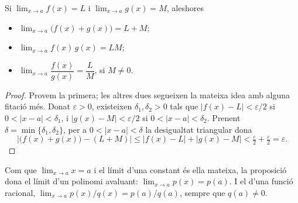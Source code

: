 
\begin{frame}

\begin{proposition}
Si $\lim_{x \to a} f(x) = L$ i $\lim_{x \to a} g(x) = M$, aleshores
\begin{itemize}
  \item $\lim_{x \to a} \bigl(f(x) + g(x)\bigr) = L + M$;
  \item $\lim_{x \to a} f(x)\,g(x) = L M$;
  \item $\lim_{x \to a} \dfrac{f(x)}{g(x)} = \dfrac{L}{M}$, si $M \neq 0$.
\end{itemize}
\end{proposition}

\begin{notesonly}
\begin{proof}
Provem la primera; les altres dues segueixen la mateixa idea amb alguna
fitació més. Donat $\varepsilon > 0$, existeixen $\delta_1, \delta_2 > 0$
tals que $|f(x) - L| < \varepsilon/2$ si $0 < |x - a| < \delta_1$, i
$|g(x) - M| < \varepsilon/2$ si $0 < |x - a| < \delta_2$. Prenent
$\delta = \min\{\delta_1, \delta_2\}$, per a $0 < |x - a| < \delta$ la
desigualtat triangular dona
\[
  \bigl|\bigl(f(x) + g(x)\bigr) - (L + M)\bigr|
  \le |f(x) - L| + |g(x) - M|
  < \tfrac{\varepsilon}{2} + \tfrac{\varepsilon}{2} = \varepsilon .
\]
\end{proof}
\end{notesonly}

\dpause

\begin{remark}
Com que $\lim_{x \to a} x = a$ i el límit d'una constant és ella mateixa, la
proposició dona el límit d'un polinomi avaluant: $\lim_{x \to a} p(x) =
p(a)$. I el d'una funció racional, $\lim_{x \to a} p(x)/q(x) = p(a)/q(a)$,
sempre que $q(a) \neq 0$.
\end{remark}

\end{frame}
